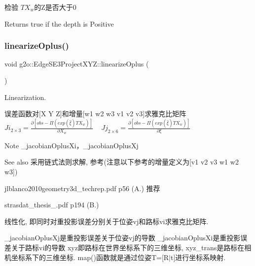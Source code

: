 检验 $ TX_w $的\+Z是否大于0 \begin{DoxyReturn}{Returns}
true if the depth is Positive 
\end{DoxyReturn}
\mbox{\label{classg2o_1_1_edge_s_e3_project_x_y_z_a7454e89740635d782c9e4efaef35ec44}} 
\subsubsection{\texorpdfstring{linearize\+Oplus()}{linearizeOplus()}}
{\footnotesize\ttfamily void g2o\+::\+Edge\+S\+E3\+Project\+X\+Y\+Z\+::linearize\+Oplus (\begin{DoxyParamCaption}{ }\end{DoxyParamCaption})\hspace{0.3cm}{\ttfamily [virtual]}}



Linearization. 

误差函数对\mbox{[}X Y Z\mbox{]}和增量\mbox{[}w1 w2 w3 v1 v2 v3\mbox{]}求雅克比矩阵 ~\newline
 $Ji_{2\times3} = \frac{\partial [obs - \Pi(exp(\hat{\xi}) T X_w)]}{\partial X_w} $ ~\newline
 $Jj_{2\times6} = \frac{\partial [obs - \Pi(exp(\hat{\xi}) T X_w)]}{\partial \xi} $ ~\newline
\begin{DoxyNote}{Note}
\+\_\+jacobian\+Oplus\+Xi，\+\_\+jacobian\+Oplus\+Xj 
\end{DoxyNote}
\begin{DoxySeeAlso}{See also}
采用链式法则求解, 参考(注意以下参考的增量定义为\mbox{[}v1 v2 v3 w1 w2 w3\mbox{]})
\begin{DoxyItemize}
\item jlblanco2010geometry3d\+\_\+techrep.\+pdf p56 (A.) 推荐
\item strasdat\+\_\+thesis\+\_.\+pdf p194 (B.)
\end{DoxyItemize}
\end{DoxySeeAlso}
线性化, 即同时对重投影误差分别关于位姿vj和路标vi求雅克比矩阵.

\+\_\+jacobian\+Oplus\+Xj是重投影误差关于位姿vj的导数 \+\_\+jacobian\+Oplus\+Xi是重投影误差关于路标vi的导数 xyz即路标在世界坐标系下的三维坐标, xyz\+\_\+trans是路标在相机坐标系下的三维坐标. map()函数就是通过位姿T=\mbox{[}R$\vert$t\mbox{]}进行坐标系映射. 

